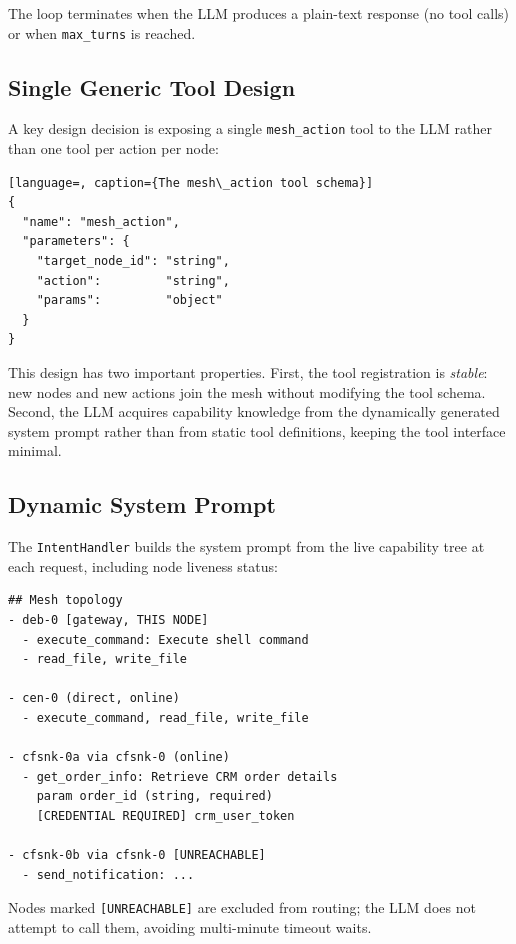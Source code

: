 \documentclass[10pt,twocolumn]{article}
\begin{document}
The loop terminates when the LLM produces a plain-text response (no tool
calls) or when \texttt{max\_turns} is reached.

\subsection{Single Generic Tool Design}

A key design decision is exposing a single \texttt{mesh\_action} tool
to the LLM rather than one tool per action per node:

\begin{lstlisting}[language=, caption={The mesh\_action tool schema}]
{
  "name": "mesh_action",
  "parameters": {
    "target_node_id": "string",
    "action":         "string",
    "params":         "object"
  }
}
\end{lstlisting}

This design has two important properties. First, the tool registration
is \emph{stable}: new nodes and new actions join the mesh without
modifying the tool schema. Second, the LLM acquires capability knowledge
from the dynamically generated system prompt rather than from static
tool definitions, keeping the tool interface minimal.

\subsection{Dynamic System Prompt}

The \texttt{IntentHandler} builds the system prompt from the live
capability tree at each request, including node liveness status:

\begin{lstlisting}[caption={Excerpt of generated system prompt}]
## Mesh topology
- deb-0 [gateway, THIS NODE]
  - execute_command: Execute shell command
  - read_file, write_file

- cen-0 (direct, online)
  - execute_command, read_file, write_file

- cfsnk-0a via cfsnk-0 (online)
  - get_order_info: Retrieve CRM order details
    param order_id (string, required)
    [CREDENTIAL REQUIRED] crm_user_token

- cfsnk-0b via cfsnk-0 [UNREACHABLE]
  - send_notification: ...
\end{lstlisting}

Nodes marked \texttt{[UNREACHABLE]} are excluded from routing; the LLM
does not attempt to call them, avoiding multi-minute timeout waits.
\end{document}
